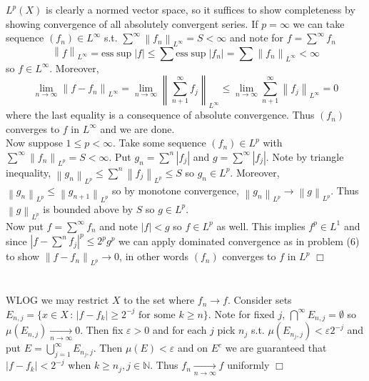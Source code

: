 \documentclass{article}
\newcommand{\norm}[1]{\left\lVert#1\right\rVert}
\begin{document}
\section{}
$L^p(X)$ is clearly a normed vector space, so it suffices to show completeness by showing convergence of all absolutely convergent series. If $p = \infty$ we can take sequence $(f_n) \in L^\infty$ s.t. $\sum\limits^\infty \norm{f_n}_{L^{\infty}} = S < \infty$ and note for $f = \sum\limits^\infty f_n$
$$\norm{f}_{L^{\infty}} = \text{ess}\sup|f| \leq \sum\text{ess}\sup|f_n| = \sum \norm{f_n}_{L^{\infty}} < \infty $$
so $f \in L^\infty$. Moreover,
$$\lim\limits_{n\rightarrow\infty}\norm{f-f_n}_{L^{\infty}} = \lim\limits_{n\rightarrow\infty}\norm{\sum\limits_{n+1}^\infty f_j}_{L^{\infty}} \leq \lim\limits_{n\rightarrow\infty} \sum\limits_{n+1}^\infty \norm{f_j}_{L^{\infty}} = 0$$
where the last equality is a consequence of absolute convergence. Thus $(f_n)$ converges to $f$ in $L^\infty$ and we are done.\\
Now suppose $1\leq p < \infty$. Take some sequence $(f_n) \in L^p$ with $\sum\limits^\infty \norm{f_n}_{L^{p}} = S < \infty$. Put $g_n = \sum\limits^n |f_j|$ and $g = \sum\limits^\infty |f_j|$. Note by triangle inequality, $\norm{g_n}_{L^{p}} \leq \sum\limits^n \norm{f_j}_{L^{p}} \leq S$ so $g_n \in L^p$. Moreover, $\norm{g_n}_{L^{p}} \leq \norm{g_{n+1}}_{L^{p}}$ so by monotone convergence, $\norm{g_n}_{L^{p}} \rightarrow \norm{g}_{L^{p}}$. Thus $\norm{g}_{L^{p}}$ is bounded above by $S$ so $g \in L^p$.\\
Now put $f = \sum\limits^\infty f_n$ and note $|f| < g$ so $f \in L^p$ as well. This implies $f^p \in L^1$ and since $|f-\sum\limits^n f_j|^p \leq 2^pg^p$ we can apply dominated convergence as in problem (6) to show $\norm{f-f_n}_{L^{p}} \rightarrow 0$, in other words $(f_n)$ converges to $f$ in $L^p$ $\Box$

\section{}
WLOG we may restrict $X$ to the set where $f_n \rightarrow f$. Consider sets $E_{n,j} = \{ x\in X \,:\, |f - f_k| \geq 2^{-j} \textrm{ for some } k\geq n \}$. Note for fixed $j$, $\bigcap\limits^\infty E_{n,j} = \emptyset$ so $\mu(E_{n,j}) \xrightarrow[n\rightarrow\infty]{} 0$. Then fix $\varepsilon > 0$ and for each $j$ pick $n_j$ s.t. $\mu(E_{n_j,j}) < \varepsilon 2^{-j}$ and put $E = \bigcup\limits^\infty_{j = 1} E_{n_j,j}$. Then $\mu(E) < \varepsilon$ and on $E^c$ we are guaranteed that $|f-f_k| < 2^{-j}$ when $k \geq n_j, j\in \mathbb{N}$. Thus $f_n \xrightarrow[n\rightarrow\infty]{} f$ uniformly $\Box$
\end{document}
